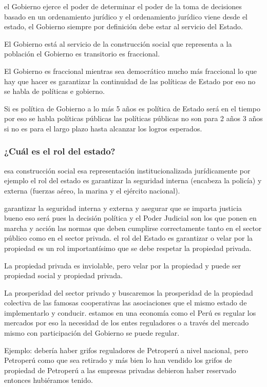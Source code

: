 \documentclass[
  letterpaper,
  DIV=11,
  numbers=noendperiod]{scrartcl}
\begin{document}
el Gobierno ejerce el poder de determinar el poder de la toma de
decisiones basado en un ordenamiento jurídico y el ordenamiento jurídico
viene desde el estado, el Gobierno siempre por definición debe estar al
servicio del Estado.

El Gobierno está al servicio de la construcción social que representa a
la población el Gobierno es transitorio es fraccional.

El Gobierno es fraccional mientras sea democrático mucho más fraccional
lo que hay que hacer es garantizar la continuidad de las políticas de
Estado por eso no se habla de políticas e gobierno.

Si es política de Gobierno a lo más 5 años es política de Estado será en
el tiempo por eso se habla políticas públicas las políticas públicas no
son para 2 años 3 años si no es para el largo plazo hasta alcanzar los
logros esperados.

\hypertarget{cuuxe1l-es-el-rol-del-estado}{%
\subsubsection{¿Cuál es el rol del
estado?}\label{cuuxe1l-es-el-rol-del-estado}}

esa construcción social esa representación institucionalizada
jurídicamente por ejemplo el rol del estado es garantizar la seguridad
interna (encabeza la policía) y externa (fuerzas aéreo, la marina y el
ejército nacional).

garantizar la seguridad interna y externa y asegurar que se imparta
justicia bueno eso será pues la decisión política y el Poder Judicial
son los que ponen en marcha y acción las normas que deben cumplirse
correctamente tanto en el sector público como en el sector privada. el
rol del Estado es garantizar o velar por la propiedad es un rol
importantísimo que se debe respetar la propiedad privada.

La propiedad privada es inviolable, pero velar por la propiedad y puede
ser propiedad social y propiedad privada.

La prosperidad del sector privado y buscaremos la prosperidad de la
propiedad colectiva de las famosas cooperativas las asociaciones que el
mismo estado de implementarlo y conducir. estamos en una economía como
el Perú es regular los mercados por eso la necesidad de los entes
reguladores o a través del mercado mismo con participación del Gobierno
se puede regular.

Ejemplo: debería haber grifos reguladores de Petroperú a nivel nacional,
pero Petroperú como que sea retirado y más bien lo han vendido los
grifos de propiedad de Petroperú a las empresas privadas debieron haber
reservado entonces hubiéramos tenido.
\end{document}
